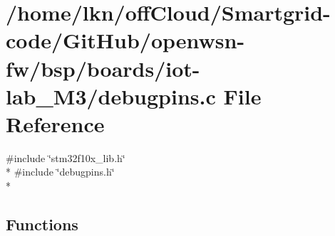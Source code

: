 \hypertarget{iot-lab___m3_2debugpins_8c}{}\section{/home/lkn/off\+Cloud/\+Smartgrid-\/code/\+Git\+Hub/openwsn-\/fw/bsp/boards/iot-\/lab\+\_\+\+M3/debugpins.c File Reference}
\label{iot-lab___m3_2debugpins_8c}
{\ttfamily \#include \char`\"{}stm32f10x\+\_\+lib.\+h\char`\"{}}\\*
{\ttfamily \#include \char`\"{}debugpins.\+h\char`\"{}}\\*
\subsection*{Functions}
